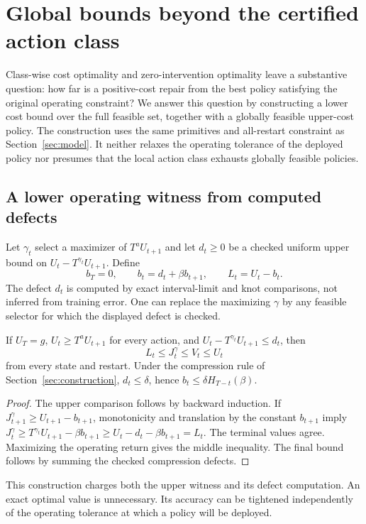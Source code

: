 \section{Global bounds beyond the certified action class}\label{sec:global}
Class-wise cost optimality and zero-intervention optimality leave a substantive question: how far is a positive-cost repair from the best policy satisfying the original operating constraint? We answer this question by constructing a lower cost bound over the full feasible set, together with a globally feasible upper-cost policy. The construction uses the same primitives and all-restart constraint as Section~\ref{sec:model}. It neither relaxes the operating tolerance of the deployed policy nor presumes that the local action class exhausts globally feasible policies.

\subsection{A lower operating witness from computed defects}
Let $\gamma_t$ select a maximizer of $T^aU_{t+1}$ and let $d_t\ge0$ be a checked uniform upper bound on $U_t-T^{\gamma_t}U_{t+1}$. Define
\begin{equation}\label{eq:lowerconstruct}
 b_T=0,\qquad b_t=d_t+\beta b_{t+1},\qquad L_t=U_t-b_t.
\end{equation}
The defect $d_t$ is computed by exact interval-limit and knot comparisons, not inferred from training error. One can replace the maximizing $\gamma$ by any feasible selector for which the displayed defect is checked.
\begin{lemma}\label{lem:lower}
If $U_T=g$, $U_t\ge T^aU_{t+1}$ for every action, and $U_t-T^{\gamma_t}U_{t+1}\le d_t$, then
\begin{equation}\label{eq:two-sided}
 L_t\le J_t^\gamma\le V_t\le U_t
\end{equation}
from every state and restart. Under the compression rule of Section~\ref{sec:construction}, $d_t\le\delta$, hence $b_t\le\delta H_{T-t}(\beta)$.
\end{lemma}
\begin{proof}
The upper comparison follows by backward induction. If $J_{t+1}^\gamma\ge U_{t+1}-b_{t+1}$, monotonicity and translation by the constant $b_{t+1}$ imply
$J_t^\gamma\ge T^{\gamma_t}U_{t+1}-\beta b_{t+1}\ge U_t-d_t-\beta b_{t+1}=L_t$.
The terminal values agree. Maximizing the operating return gives the middle inequality. The final bound follows by summing the checked compression defects.\end{proof}
This construction charges both the upper witness and its defect computation. An exact optimal value is unnecessary. Its accuracy can be tightened independently of the operating tolerance at which a policy will be deployed.

